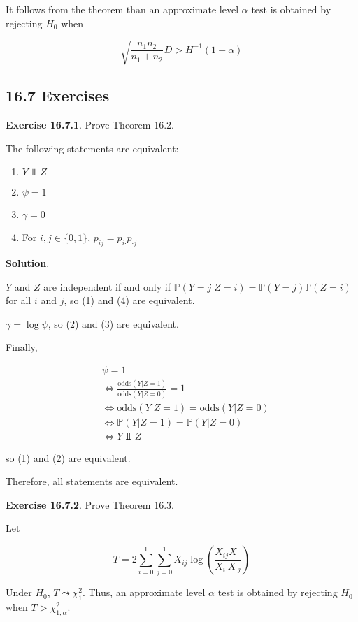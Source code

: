 {It follows from the theorem than an approximate level \(\alpha\) test is
obtained by rejecting \(H_0\) when

\[ \sqrt{\frac{n_1 n_2}{n_1 + n_2}} D > H^{-1}(1 - \alpha) \]

\subsection{16.7 Exercises}\label{exercises}

\textbf{Exercise 16.7.1}. Prove Theorem 16.2.

The following statements are equivalent:

\begin{enumerate}[tightlist,label={\arabic*.}]
\item
  \(Y \text{ ⫫ } Z\)
\item
  \(\psi = 1\)
\item
  \(\gamma = 0\)
\item
  For \(i, j \in \{ 0, 1 \}\), \(p_{ij} = p_{i\text{·}} p_{\text{·}j}\)
\end{enumerate}

\textbf{Solution}.

\(Y\) and \(Z\) are independent if and only if
\(\mathbb{P}(Y = j | Z = i) = \mathbb{P}(Y = j) \mathbb{P}(Z = i)\) for
all \(i\) and \(j\), so (1) and (4) are equivalent.

\(\gamma = \log \psi\), so (2) and (3) are equivalent.

Finally,

\begin{align}
&\psi = 1\\
&\Leftrightarrow \frac{\text{odds}(Y | Z = 1)}{\text{odds}(Y | Z = 0)} = 1 \\
&\Leftrightarrow \text{odds}(Y | Z = 1) = \text{odds}(Y | Z = 0) \\
&\Leftrightarrow \mathbb{P}(Y | Z = 1) = \mathbb{P}(Y | Z = 0) \\
&\Leftrightarrow Y \text{ ⫫ } Z
\end{align}

so (1) and (2) are equivalent.

Therefore, all statements are equivalent.

\textbf{Exercise 16.7.2}. Prove Theorem 16.3.

Let

\[ T = 2 \sum_{i=0}^1 \sum_{j=0}^1 X_{ij} \log \left( \frac{X_{ij} X_{\text{··}}}{X_{i\text{·}} X_{\text{·}j}} \right)\]

Under \(H_0\), \(T \leadsto \chi_1^2\). Thus, an approximate level
\(\alpha\) test is obtained by rejecting \(H_0\) when
\(T > \chi_{1, \alpha}^2\).

}
